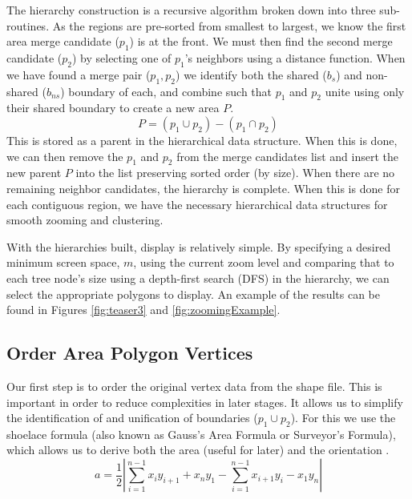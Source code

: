 The hierarchy construction is a recursive algorithm broken down into three sub-routines. As the regions are pre-sorted from smallest to largest, we know the first area merge candidate ($p_1$) is at the front. We must then find the second merge candidate ($p_2$) by selecting one of $p_1$'s neighbors using a distance function. When we have found a merge pair ($p_1, p_2$) we identify both the shared ($b_{s}$) and non-shared ($b_{ns}$) boundary of each, and combine such that $p_1$ and $p_2$ unite using only their shared boundary to create a new area $P$. 
\begin{equation} \label{eq:P}
P = (p_1 \cup  p_2) - (p_1 \cap p_2) 
\end{equation}
This is stored as a parent in the hierarchical data structure. When this is done, we can then remove the $p_1$ and $p_2$ from the merge candidates list and insert the new parent $P$ into the list preserving sorted order (by size). When there are no remaining neighbor candidates, the hierarchy is complete. When this is done for each contiguous region, we have the necessary hierarchical data structures for smooth zooming and clustering. 

With the hierarchies built, display is relatively simple. By specifying a desired minimum screen space, $m$, using the current zoom level and comparing that to each tree node's size using a depth-first search (DFS) in the hierarchy, we can select the appropriate polygons to display. An example of the results can be found in Figures \ref{fig:teaser3} and \ref{fig:zoomingExample}.

\subsection{Order Area Polygon Vertices} \label{ordering}
Our first step is to order the original vertex data from the shape file. This is important in order to reduce complexities in later stages. It allows us to simplify the identification of and unification of boundaries ($p_1 \cup p_2$). For this we use the shoelace formula (also known as Gauss's Area Formula or Surveyor's Formula), which allows us to derive both the area (useful for later) and the orientation \cite{braden1986surveyor}.
\begin{equation}\label{eq:surveyor}
a = \frac{1}{2} \left | \sum_{i=1}^{n-1} x_iy_{i+1} + x_ny_1 - \sum_{i=1}^{n-1} x_{i+1}y_i - x_1y_n \right |
\end{equation} 

